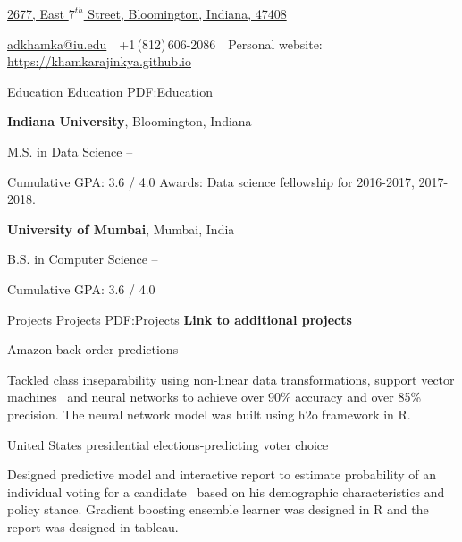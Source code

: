 \documentclass[a4paper]{simpleresumecv}
\newcommand{\CVAuthor}{Ajinkya Khamkar}
\newcommand{\CVWebpage}{https://khamkarajinkya.github.io}
\begin{document}

\Title{\CVAuthor}

\begin{SubTitle}
\href{https://www.google.com/maps/place/Park+Doral+Apartments/@39.1684389,-86.5009352,17z/data=!3m1!4b1!4m5!3m4!1s0x886c641e02d36af5:0xb2e52a6ee480eb5f!8m2!3d39.1684389!4d-86.4987465}
{2677, East $7^{th}$ Street, Bloomington, Indiana, 47408}
\par
\href{mailto:adkhamka@iu.edu}
{adkhamka@iu.edu}
\,\SubBulletSymbol\,
+1\,(812)\,606-2086
\,\SubBulletSymbol\,
Personal website:
\href{\CVWebpage}
{\url{\CVWebpage}}
\end{SubTitle}

\begin{Body}


\Section
{Education}
{Education}
{PDF:Education}

\Entry
{\textbf{Indiana University}},
Bloomington, Indiana

\Gap
M.S. in Data Science
\hfill
{} --
\begin{Detail}
\SubBulletItem
Cumulative GPA: 3.6 / 4.0
\SubBulletItem
Awards: Data science fellowship for 2016-2017, 2017-2018.
\end{Detail}

\BigGap
\Entry
{\textbf{University of Mumbai}},
Mumbai, India

\Gap
B.S. in Computer Science
\hfill
{} --
\begin{Detail}
\SubBulletItem
Cumulative GPA: 3.6 / 4.0
\end{Detail}
\Gap



\Section
{Projects}
{Projects}
{PDF:Projects}
\Gap
\Entry
\href{https://khamkarajinkya.github.io/work}
{\textbf{Link to additional projects}}

Amazon back order predictions
\begin{Detail}
\SubBulletItem
Tackled class inseparability using non-linear data transformations, support vector machines \ and neural networks to achieve over 90\% accuracy and over 85\% precision.
\SubBulletItem
The neural network model was built using h2o framework in R. 
\end{Detail}
\Gap

United States presidential elections-predicting voter choice
\begin{Detail}
\SubBulletItem
Designed predictive model and interactive report to estimate probability of an individual voting for a candidate \ based on his demographic characteristics and policy stance.
\SubBulletItem
Gradient boosting ensemble learner was designed in R and the report was designed in tableau.
\end{Detail}
\Gap


\end{Body}
\end{document}
